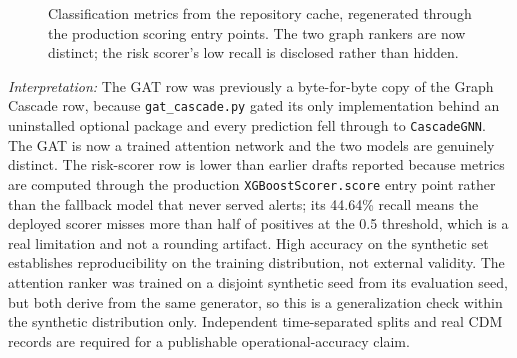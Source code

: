 \documentclass[conference]{IEEEtran}
\begin{document}
\begin{figure}[h]
\centering
{}
\caption{Classification metrics from the repository cache, regenerated through
the production scoring entry points. The two graph rankers are now distinct; the
risk scorer's low recall is disclosed rather than hidden.}
\label{fig:metrics_bar}
\end{figure}

\textit{Interpretation:} The GAT row was previously a byte-for-byte copy of the
Graph Cascade row, because \texttt{gat\_cascade.py} gated its only implementation
behind an uninstalled optional package and every prediction fell through to
\texttt{CascadeGNN}. The GAT is now a trained attention network and the two
models are genuinely distinct. The risk-scorer row is lower than earlier drafts
reported because metrics are computed through the production
\texttt{XGBoostScorer.score} entry point rather than the fallback model that never
served alerts; its 44.64\% recall means the deployed scorer misses more than half
of positives at the 0.5 threshold, which is a real limitation and not a rounding
artifact. High accuracy on the synthetic set establishes reproducibility on the
training distribution, not external validity. The attention ranker was trained on
a disjoint synthetic seed from its evaluation seed, but both derive from the same
generator, so this is a generalization check within the synthetic distribution
only. Independent time-separated splits and real CDM records are required for a
publishable operational-accuracy claim.
\end{document}

